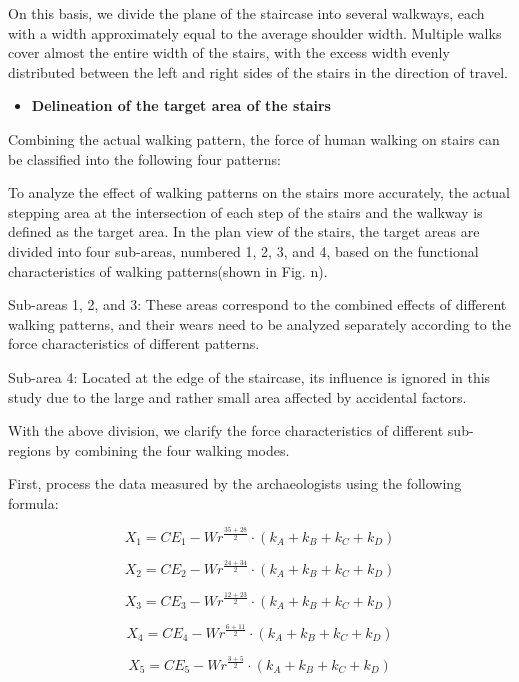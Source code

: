 \documentclass{mcmthesis}
\begin{document}
On this basis, we divide the plane of the staircase into several walkways, each with a width approximately equal to the average shoulder width. Multiple walks cover almost the entire width of the stairs, with the excess width evenly distributed between the left and right sides of the stairs in the direction of travel.
\begin{itemize}[label=$\diamond$]
\item \textbf{Delineation of the target area of the stairs}
\end{itemize}

Combining the actual walking pattern, the force of human walking on stairs can be classified into the following four patterns:




To analyze the effect of walking patterns on the stairs more accurately, the actual stepping area at the intersection of each step of the stairs and the walkway is defined as the target area. In the plan view of the stairs, the target areas are divided into four sub-areas, numbered 1, 2, 3, and 4, based on the functional characteristics of walking patterns(shown in Fig. n).



Sub-areas 1, 2, and 3: These areas correspond to the combined effects of different walking patterns, and their wears need to be analyzed separately according to the force characteristics of different patterns.

Sub-area 4: Located at the edge of the staircase, its influence is ignored in this study due to the large and rather small area affected by accidental factors.

With the above division, we clarify the force characteristics of different sub-regions by combining the four walking modes.

First, process the data measured by the archaeologists using the following formula:

\[ X_1 = CE_1 - Wr^{\frac{35 + 28}{2}} \cdot \left(k_A + k_B + k_C + k_D\right) \]

\[ X_2 = CE_2 - Wr^{\frac{24 + 34}{2}} \cdot \left(k_A + k_B + k_C + k_D\right) \]

\[ X_3 = CE_3 - Wr^{\frac{12 + 23}{2}} \cdot \left(k_A + k_B + k_C + k_D\right) \]

\[ X_4 = CE_4 - Wr^{\frac{6 + 11}{2}} \cdot \left(k_A + k_B + k_C + k_D\right) \]

\[ X_5 = CE_5 - Wr^{\frac{3 + 5}{2}} \cdot \left(k_A + k_B + k_C + k_D\right) \]
\end{document}
